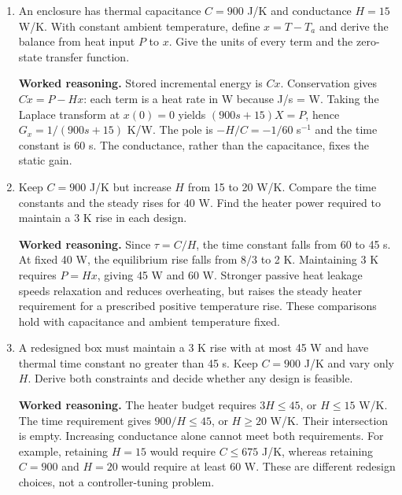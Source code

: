 \documentclass[10pt,a4paper]{article}
\newcommand{\answer}{\par\smallskip\textbf{Worked reasoning.} }
\begin{document}
\begin{enumerate}
\item An enclosure has thermal capacitance $C=900$ J/K and conductance $H=15$ W/K. With constant ambient temperature, define $x=T-T_a$ and derive the balance from heat input $P$ to $x$. Give the units of every term and the zero-state transfer function.
\answer Stored incremental energy is $Cx$. Conservation gives $C\dot x=P-Hx$: each term is a heat rate in W because J/s = W. Taking the Laplace transform at $x(0)=0$ yields $(900s+15)X=P$, hence $G_x=1/(900s+15)$ K/W. The pole is $-H/C=-1/60$ s$^{-1}$ and the time constant is 60 s. The conductance, rather than the capacitance, fixes the static gain.
\item Keep $C=900$ J/K but increase $H$ from 15 to 20 W/K. Compare the time constants and the steady rises for 40 W. Find the heater power required to maintain a 3 K rise in each design.
\answer Since $\tau=C/H$, the time constant falls from 60 to 45 s. At fixed 40 W, the equilibrium rise falls from $8/3$ to 2 K. Maintaining 3 K requires $P=Hx$, giving 45 W and 60 W. Stronger passive heat leakage speeds relaxation and reduces overheating, but raises the steady heater requirement for a prescribed positive temperature rise. These comparisons hold with capacitance and ambient temperature fixed.
\item A redesigned box must maintain a 3 K rise with at most 45 W and have thermal time constant no greater than 45 s. Keep $C=900$ J/K and vary only $H$. Derive both constraints and decide whether any design is feasible.
\answer The heater budget requires $3H\le45$, or $H\le15$ W/K. The time requirement gives $900/H\le45$, or $H\ge20$ W/K. Their intersection is empty. Increasing conductance alone cannot meet both requirements. For example, retaining $H=15$ would require $C\le675$ J/K, whereas retaining $C=900$ and $H=20$ would require at least 60 W. These are different redesign choices, not a controller-tuning problem.
\end{enumerate}
\end{document}

